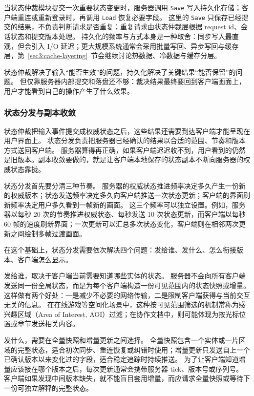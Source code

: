 当状态仲裁模块提交一次重要状态变更时，服务器调用 \texttt{Save} 写入持久化存储；客户端重连或重新登录时，再调用 \texttt{Load} 恢复必要字段。
这里的 \texttt{Save} 只保存已经提交的结果，不负责判断请求是否重复；重复请求由状态仲裁层根据 request id、会话状态和提交版本处理。
持久化的频率与方式本身是一种取舍：同步写入最直观，但会引入 I/O 延迟；更大规模系统通常会采用批量写回、异步写回与缓存层，第~\ref{sec3:cache-layering}~节会继续讨论热数据、冷数据与缓存分层。

状态仲裁解决了输入“能否生效”的问题，持久化解决了关键结果“能否保留”的问题。
但仅靠服务器内部提交和落盘还不够：裁决结果最终要回到客户端画面上，用户才能看到自己的操作产生了什么效果。

\subsubsection{状态分发与副本收敛}\label{sec2:world-sync}

状态仲裁把输入事件提交成权威状态之后，这些结果还需要到达客户端才能呈现在用户界面上。
状态分发负责把服务器已经确认的结果以合适的范围、节奏和版本方式送回客户端。
服务器算得再正确，如果客户端迟迟收不到，用户看到的仍然是旧版本。副本收敛要做的，就是让客户端本地保存的状态副本不断向服务器的权威状态靠拢。

状态分发首先要分清三种节奏。
服务器的权威状态推进频率决定多久产生一份新的权威版本；状态发送频率决定多久向客户端推送一次状态更新；客户端的界面刷新频率决定用户多久看到一帧新的画面。
这三个频率可以独立设置。例如，服务器以每秒 20 次的节奏推进权威状态、每秒发送 10 次状态更新，而客户端以每秒 60 帧的速度刷新界面；一次更新可以汇总多次状态变化，客户端则在相邻两次更新之间绘制多帧过渡画面。

在这个基础上，状态分发需要依次解决四个问题：发给谁、发什么、怎么衔接版本、客户端怎么显示。

发给谁，取决于客户端当前需要知道哪些实体的状态。
服务器不会向所有客户端发送同一份全局状态，而是为每个客户端构造一份可见范围内的状态快照或增量。
这样做有两个好处：一是减少不必要的网络传输，二是限制客户端获得与当前交互无关的信息。
在在线游戏等空间化场景中，这种按可见范围筛选的机制常称为感兴趣区域（Area of Interest, AOI）过滤；在协作文档中，则可能体现为按光标位置或章节发送相关内容。

发什么，需要在全量快照和增量更新之间选择。
全量快照包含一个实体或一片区域的完整状态，适合初次同步、重连恢复或纠错时使用；增量更新只发送自上一个已确认版本以来变化过的字段，适合稳定追踪时持续推送。
为了让客户端知道增量应该接在哪个版本之后，每次更新通常会携带服务器 tick、版本号或序列号。
客户端如果发现中间版本缺失，就不能盲目套用增量，而应请求全量快照或等待下一份可独立解释的完整状态。


